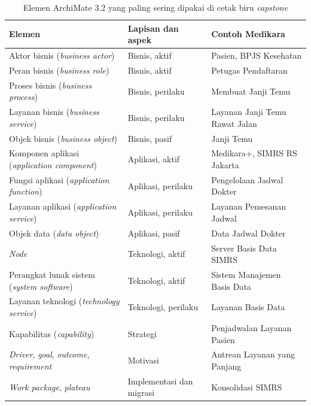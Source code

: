\begin{table}[!htb]
  \centering
  \caption{Elemen ArchiMate 3.2 yang paling sering dipakai di cetak biru
           \textit{capstone}}
  \label{tab:ch04-elemen}
  \small
  \begin{tabularx}{\textwidth}{>{\raggedright\arraybackslash}p{3.3cm}lX}
    \hline
    \textbf{Elemen} & \textbf{Lapisan dan aspek} & \textbf{Contoh Medikara} \\
    \hline
    Aktor bisnis (\textit{business actor}) & Bisnis, aktif & Pasien, BPJS Kesehatan \\
    \hline
    Peran bisnis (\textit{business role}) & Bisnis, aktif & Petugas Pendaftaran \\
    \hline
    Proses bisnis (\textit{business process}) & Bisnis, perilaku & Membuat Janji Temu \\
    \hline
    Layanan bisnis (\textit{business service}) & Bisnis, perilaku & Layanan Janji Temu Rawat Jalan \\
    \hline
    Objek bisnis (\textit{business object}) & Bisnis, pasif & Janji Temu \\
    \hline
    Komponen aplikasi (\textit{application component}) & Aplikasi, aktif & Medikara+, SIMRS RS Jakarta \\
    \hline
    Fungsi aplikasi (\textit{application function}) & Aplikasi, perilaku & Pengelolaan Jadwal Dokter \\
    \hline
    Layanan aplikasi (\textit{application service}) & Aplikasi, perilaku & Layanan Pemesanan Jadwal \\
    \hline
    Objek data (\textit{data object}) & Aplikasi, pasif & Data Jadwal Dokter \\
    \hline
    \textit{Node} & Teknologi, aktif & Server Basis Data SIMRS \\
    \hline
    Perangkat lunak sistem (\textit{system software}) & Teknologi, aktif & Sistem Manajemen Basis Data \\
    \hline
    Layanan teknologi (\textit{technology service}) & Teknologi, perilaku & Layanan Basis Data \\
    \hline
    Kapabilitas (\textit{capability}) & Strategi & Penjadwalan Layanan Pasien \\
    \hline
    \textit{Driver}, \textit{goal}, \textit{outcome}, \textit{requirement} & Motivasi & Antrean Layanan yang Panjang \\
    \hline
    \textit{Work package}, \textit{plateau} & Implementasi dan migrasi & Konsolidasi SIMRS \\
    \hline
  \end{tabularx}
\end{table}

